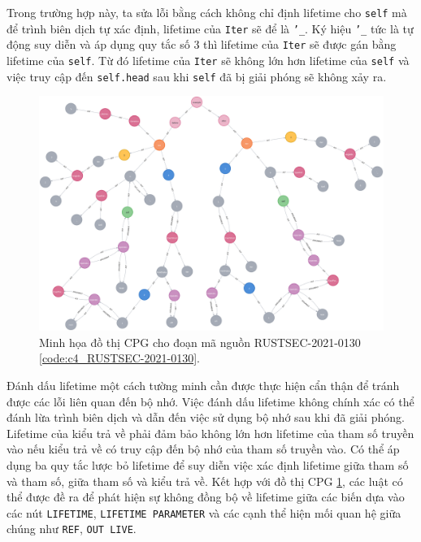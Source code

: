 Trong trường hợp này, ta sửa lỗi bằng cách không chỉ định lifetime cho \texttt{self} mà để trình biên dịch tự xác định, lifetime của \texttt{Iter} sẽ để là \texttt{'\_}.
Ký hiệu \texttt{'\_} tức là tự động suy diễn và áp dụng quy tắc số 3 thì lifetime của \texttt{Iter} sẽ được gán bằng lifetime của \texttt{self}.
Từ đó lifetime của \texttt{Iter} sẽ không lớn hơn lifetime của \texttt{self} và việc truy cập đến \texttt{self.head} sau khi \texttt{self} đã bị giải phóng sẽ không xảy ra.

\begin{figure}[H]
    \includegraphics[width=1\columnwidth]{figures/c4/c4_RUSTSEC-2021-0130.png}
    \centering
    \caption{Minh họa đồ thị CPG cho đoạn mã nguồn RUSTSEC-2021-0130 \ref{code:c4_RUSTSEC-2021-0130}.}
    \label{img:c4_RUSTSEC-2021-0130}
\end{figure}

Đánh dấu lifetime một cách tường minh cần được thực hiện cẩn thận để tránh được các lỗi liên quan đến bộ nhớ.
Việc đánh dấu lifetime không chính xác có thể đánh lừa trình biên dịch và dẫn đến việc sử dụng bộ nhớ sau khi đã giải phóng.
Lifetime của kiểu trả về phải đảm bảo không lớn hơn lifetime của tham số truyền vào nếu kiểu trả về có truy cập đến bộ nhớ của tham số truyền vào.
Có thể áp dụng ba quy tắc lược bỏ lifetime để suy diễn việc xác định lifetime giữa tham số và tham số, giữa tham số và kiểu trả về.
Kết hợp với đồ thị CPG \ref{img:c4_RUSTSEC-2021-0130}, các luật có thể được đề ra để phát hiện sự không đồng bộ về lifetime giữa các biến dựa vào các nút \texttt{LIFETIME},
\texttt{LIFETIME PARAMETER} và các cạnh thể hiện mối quan hệ giữa chúng như \texttt{REF}, \texttt{OUT LIVE}.
